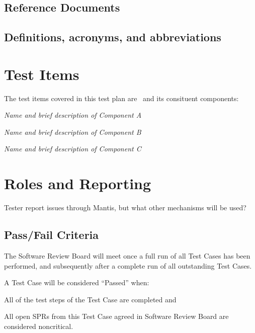 \subsection{Reference Documents}

\renewcommand{\refname}{}



\subsection{Definitions, acronyms, and abbreviations \label{sect:acronyms}} 


\section{Test Items}

The test items covered in this test plan are \product \ and its consituent components:

\begin{itemize_single}
\item {\it Name and brief description of Component A}
\item {\it Name and brief description of Component B}
\item {\it Name and brief description of Component C}
\end{itemize_single}

\section{Roles and Reporting}

Tester report issues through Mantis, but what other mechanisms will be used?

\subsection{Pass/Fail Criteria}

The Software Review Board will meet once a full run of all Test Cases has been performed, and subsequently after a complete run of all outstanding Test Cases.

A Test Case will be considered ``Passed'' when:
\begin{itemize_single}
\item All of the test steps of the Test Case are completed and
\item All open SPRs from this Test Case agreed in Software Review Board are considered noncritical.
\end{itemize_single}

